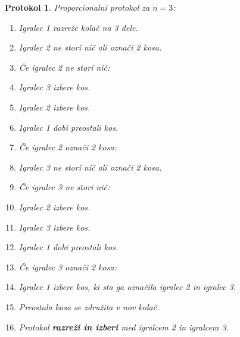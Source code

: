 \documentclass[a4paper, 12pt]{article}
\newtheorem{protokol}{Protokol}
\begin{document}
	\begin{protokol}
		\label{proporcionalni_3}
		Proporcionalni protokol za $n = 3$:
		\begin{enumerate}
			
			\item Igralec 1 razreže kolač na 3 dele.
			
			\item Igralec 2 ne stori nič ali označi 2 kosa.
			
			\item[] Če igralec 2 ne stori nič:
		
			\setcounter{enumi}{2}
			
			\item \qquad Igralec 3 izbere kos.
			
			\item \qquad Igralec 2 izbere kos.
			
			\item \qquad Igralec 1 dobi preostali kos.
			
			\item[] Če igralec 2 označi 2 kosa:

			\setcounter{enumi}{2}
			
			\item \qquad Igralec 3 ne stori nič ali označi 2 kosa.
			
			\item[] \qquad Če igralec 3 ne stori nič:
		
			\setcounter{enumi}{3}
			
			\item \qquad \qquad Igralec 2 izbere kos.
			
			\item \qquad \qquad Igralec 3 izbere kos.
			
			\item \qquad \qquad Igralec 1 dobi preostali kos.
			
			\item[] \qquad Če igralec 3 označi 2 kosa:

			\setcounter{enumi}{3}
			
			\item \qquad \qquad Igralec 1 izbere kos, ki sta ga označila igralec 2 in igralec 3.
			
			\item \qquad \qquad Preostala kosa se združita v nov kolač.
			
			\item \qquad \qquad Protokol \textbf{razreži in izberi} med igralcem 2 in igralcem 3.
			
		\end{enumerate}
	\end{protokol}
\end{document}
